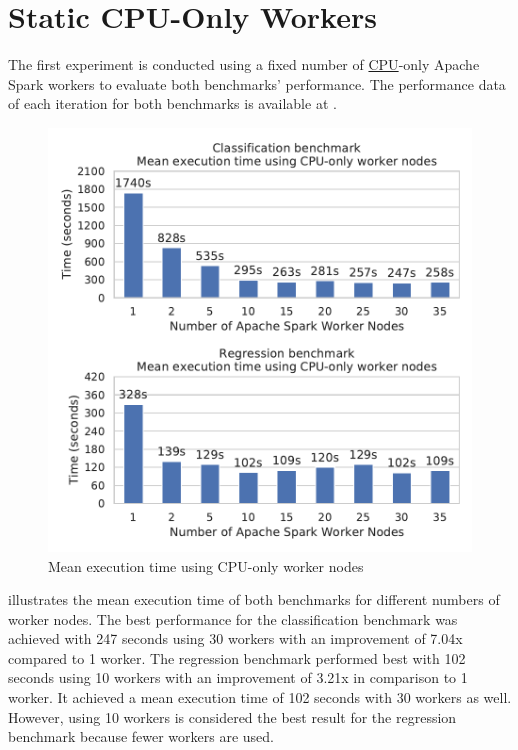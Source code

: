 \section{Static CPU-Only Workers}
\label{sec:07_static}
The first experiment is conducted using a fixed number of \hyperlink{abbr:cpu}{CPU}-only Apache Spark workers to evaluate both benchmarks' performance.
The performance data of each iteration for both benchmarks is available at .


\begin{figure}[h]
\centering
\includegraphics[scale=0.9]{images/07_evaluation/overall_cpu}
\caption{Mean execution time using CPU-only worker nodes}
\label{fig:07_static_results}
\end{figure}
 illustrates the mean execution time of both benchmarks for different numbers of worker nodes.
The best performance for the classification benchmark was achieved with 247 seconds using 30 workers with an improvement of 7.04x compared to 1 worker.
The regression benchmark performed best with 102 seconds using 10 workers with an improvement of 3.21x in comparison to 1 worker. It achieved a mean execution time of 102 seconds with 30 workers as well. However, using 10 workers is considered the best result for the regression benchmark because fewer workers are used.

